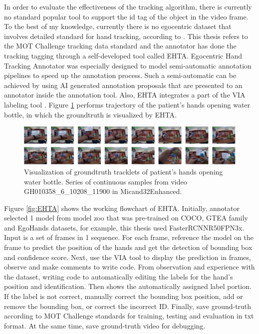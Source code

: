 In order to evaluate the effectiveness of the tracking algorithm, there is currently no standard popular tool to support the id tag of the object in the video frame. To the best of my knowledge, currently there is no egocentric dataset that involves detailed standard for hand tracking, according to \cite{9064606}. This thesis refers to the MOT Challenge tracking data standard and the annotator has done the tracking tagging through a self-developed tool called EHTA. Egocentric Hand Tracking Annotator was especially designed to model semi-automatic annotation pipelines to speed up the annotation process. Such a semi-automatic can be achieved by using AI generated annotation proposals that are presented to an annotator inside the annotation tool. Also, EHTA integrates a part of the VIA labeling tool \cite{10.1145/3343031.3350535}.
Figure \ref{fig:micand32Trajectory} performs trajectory of the patient’s hands opening water bottle, in which the groundtruth is visualized by EHTA.
\begin{figure}
	\centerline{\includegraphics[width=1\linewidth]{Figs/micand32Trajectory.png}}
	\caption{Visualization of groundtruth tracklets of patient’s hands opening water bottle. Series of continuous samples from video GH010358\_6\_10208\_11900 in Micand32Enhanced.}
	\label{fig:micand32Trajectory}
\end{figure}
Figure \ref{fig:EHTA} shows the working flowchart of EHTA. Initially, annotator selected 1 model from model zoo that was pre-trained on COCO, GTEA family and EgoHands datasets, for example, this thesis used FasterRCNNR50FPN3x. Input is a set of frames in 1 sequence. For each frame, reference the model on the frame to predict the position of the hands and get the detection of bounding box and confidence score. Next, use the VIA tool to display the prediction in frames, observe and make comments to write code. From observation and experience with the dataset, writing code to automatically editing the labels for the hand’s position and identification. Then shows the automatically assigned label portion. If the label is not correct, manually correct the bounding box position, add or remove the bounding box, or correct the incorrect ID. Finally, save ground-truth according to MOT Challenge standards for training, testing and evaluation in txt format. At the same time, save ground-truth video for debugging.
